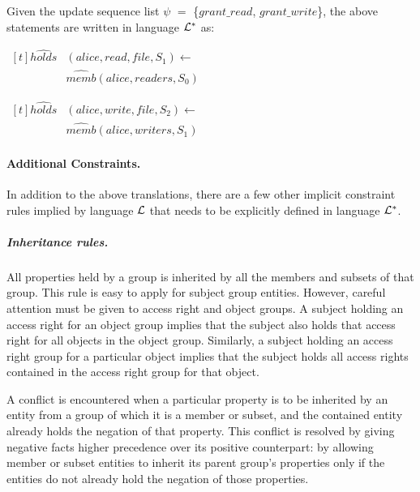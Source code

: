 \documentclass[11pt, twocolumn]{article}
\newenvironment{vquote}
  {\begin{list}{}{\leftmargin 1em}\item[]}
  {\end{list}}
\begin{document}
          Given the update sequence list $\psi$ $=$
          \{$grant\_read$, $grant\_write$\}, the above statements are written
          in language ${\cal L}^{*}$ as:

          \begin{vquote}
            \begin{math}
              \begin{aligned}[t]
                \hat{holds}&(alice, read, file, S_{1}) \leftarrow \\
                & \hat{memb}(alice, readers, S_{0})
              \end{aligned}
            \end{math}

            \begin{math}
              \begin{aligned}[t]
                \hat{holds}&(alice, write, file, S_{2}) \leftarrow \\
                & \hat{memb}(alice, writers, S_{1})
              \end{aligned}
            \end{math}
          \end{vquote}

        \paragraph{Additional Constraints.}

          In addition to the above translations, there are a few other implicit
          constraint rules implied by language ${\cal L}$ that needs to be
          explicitly defined in language ${\cal L}^{*}$.

          \subparagraph{Inheritance rules.}

            All properties held by a group is inherited by all the members and
            subsets of that group. This rule is easy to apply for subject group
            entities. However, careful attention must be given to access right
            and object groups. A subject holding an access right for an object
            group implies that the subject also holds that access right for
            all objects in the object group. Similarly, a subject holding an
            access right group for a particular object implies that the subject
            holds all access rights contained in the access right group for
            that object.

            A conflict is encountered when a particular property is to be
            inherited by an entity from a group of which it is a member or
            subset, and the contained entity already holds the negation of
            that property. This conflict is resolved by giving negative facts
            higher precedence over its positive counterpart: by allowing member
            or subset entities to inherit its parent group's properties only if
            the entities do not already hold the negation of those properties.
\end{document}
